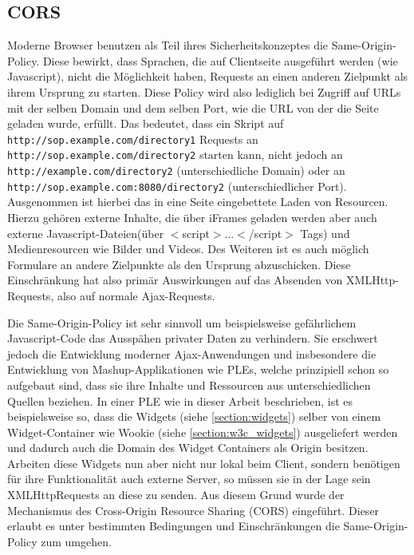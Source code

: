 \subsection{CORS}\label{section:cors}
Moderne Browser benutzen als Teil ihres Sicherheitskonzeptes die Same-Origin-Policy. Diese bewirkt, dass Sprachen, die auf Clientseite ausgeführt werden (wie Javascript), nicht die Möglichkeit haben, Requests an einen anderen Zielpunkt als ihrem Ursprung zu starten\cite{same_origin_policy_mozilla}. Diese Policy wird also lediglich bei Zugriff auf URLs mit der selben Domain und dem selben Port, wie die URL von der die Seite geladen wurde, erfüllt. Das bedeutet, dass ein Skript auf \texttt{http://sop.example.com/directory1} Requests an \texttt{http://sop.example.com/directory2} starten kann, nicht jedoch an \\ \texttt{http://example.com/directory2} (unterschiedliche Domain) oder an \\ \texttt{http://sop.example.com:8080/directory2} (unterschiedlicher Port). Ausgenommen ist hierbei das in eine Seite eingebettete Laden von Resourcen. Hierzu gehören externe Inhalte, die über iFrames geladen werden aber auch externe Javascript-Dateien(über $<$script$>$...$<$/script$>$ Tags) und Medienresourcen wie Bilder und Videos. Des Weiteren ist es auch möglich Formulare an andere Zielpunkte als den Ursprung abzuschicken. Diese Einschränkung hat also primär Auswirkungen auf das Absenden von XMLHttp-Requests, also auf normale Ajax-Requests. 

Die Same-Origin-Policy ist sehr sinnvoll um beispielsweise gefährlichem Javascript-Code das Ausspähen privater Daten zu verhindern. Sie erschwert jedoch die Entwicklung moderner Ajax-Anwendungen und insbesondere die Entwicklung von Mashup-Applikationen wie PLEs, welche prinzipiell schon so aufgebaut sind, dass sie ihre Inhalte und Ressourcen aus unterschiedlichen Quellen beziehen. In einer PLE wie in dieser Arbeit beschrieben, ist es beispielsweise so, dass die Widgets (siehe \ref{section:widgets}) selber von einem Widget-Container wie Wookie (siehe \ref{section:w3c_widgets}) ausgeliefert werden und dadurch auch die Domain des Widget Containers als Origin besitzen. Arbeiten diese Widgets nun aber nicht nur lokal beim Client, sondern benötigen für ihre Funktionalität auch externe Server, so müssen sie in der Lage sein XMLHttpRequests an diese zu senden. Aus diesem Grund wurde der Mechanismus des Cross-Origin Resource Sharing (CORS)\cite{cors_w3c} eingeführt. Dieser erlaubt es unter bestimmten Bedingungen und Einschränkungen die Same-Origin-Policy zum umgehen.

